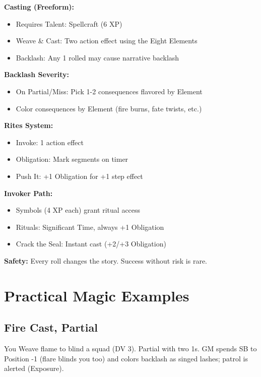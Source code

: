 \documentclass[11pt,twoside,openany]{book}
\begin{document}
\begin{tcolorbox}[colback=gray!5!white, colframe=gray!75!black, title=Magic Quick Reference, fonttitle=\bfseries,breakable]
\textbf{Casting (Freeform):}
\begin{itemize}
\item Requires Talent: Spellcraft (6 XP)
\item Weave \& Cast: Two action effect using the Eight Elements
\item Backlash: Any 1 rolled may cause narrative backlash
\end{itemize}

\textbf{Backlash Severity:}
\begin{itemize}
\item On Partial/Miss: Pick 1-2 consequences flavored by Element
\item Color consequences by Element (fire burns, fate twists, etc.)
\end{itemize}

\textbf{Rites System:}
\begin{itemize}
\item Invoke: 1 action effect
\item Obligation: Mark segments on timer
\item Push It: +1 Obligation for +1 step effect
\end{itemize}

\textbf{Invoker Path:}
\begin{itemize}
\item Symbols (4 XP each) grant ritual access
\item Rituals: Significant Time, always +1 Obligation
\item Crack the Seal: Instant cast (+2/+3 Obligation)
\end{itemize}

\textbf{Safety:} Every roll changes the story. Success without risk is rare.
\end{tcolorbox}

\section*{Practical Magic Examples} 

\subsection*{Fire Cast, Partial}

You Weave flame to blind a squad (DV 3). Partial with two 1s. GM spends SB to Position -1 (flare blinds you too) and colors backlash as singed lashes; patrol is alerted (Exposure).
\end{document}
